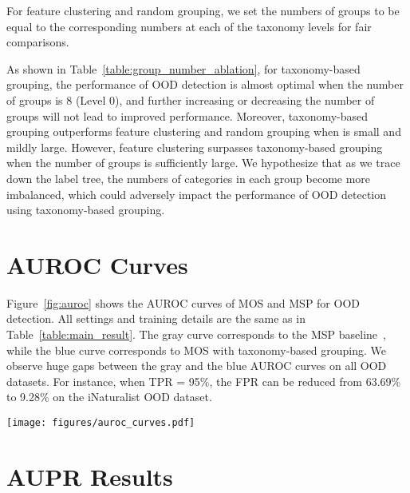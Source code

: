 \documentclass[final]{cvpr}
\begin{document}
\vspace{0.2cm}
For feature clustering and random grouping, we set the numbers of groups to be equal to the corresponding numbers at each of the taxonomy levels for fair comparisons.

As shown in Table~\ref{table:group_number_ablation}, for taxonomy-based grouping, the performance of OOD detection is almost optimal when the number of groups is 8 (Level 0), and further increasing or decreasing the number of groups will not lead to improved performance. Moreover, taxonomy-based grouping outperforms feature clustering and random grouping when  is small and mildly large. However, feature clustering surpasses taxonomy-based grouping when the number of groups is sufficiently large. We hypothesize that as we trace down the label tree, the numbers of categories in each group become more imbalanced, which could adversely impact the performance of OOD detection using taxonomy-based grouping. 









\section{AUROC Curves}
\label{app:auroc}


Figure~\ref{fig:auroc} shows the AUROC curves of MOS and MSP for OOD detection. All settings and training details are the same as in Table~\ref{table:main_result}. The gray curve corresponds to the MSP baseline~\cite{hendrycks2016baseline}, while the blue curve corresponds to MOS with taxonomy-based grouping. We observe huge gaps between the gray and the blue AUROC curves on all OOD datasets. For instance, when TPR = 95\%, the FPR can be reduced from 63.69\% to 9.28\% on the iNaturalist OOD dataset.

\begin{figure*}[h]
    \centering
    \texttt{[image: figures/auroc\_curves.pdf]}
    \caption{\small{AUROC curves of MOS (blue) and MSP (gray) on four OOD datasets.}}
    \label{fig:auroc}
\end{figure*}

\section{AUPR Results}
\label{app:aupr}
\end{document}
